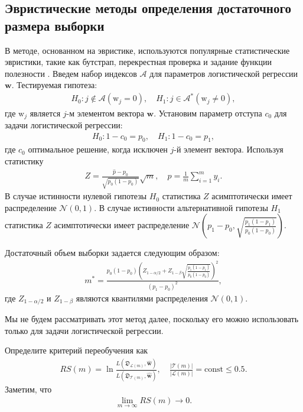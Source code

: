 \subsection{Эвристические методы определения достаточного размера выборки}
В методе, основанном на эвристике, используются популярные статистические эвристики, такие как бутстрап, перекрестная проверка и задание функции полезности .
Введем набор индексов $\mathcal {A} $ для параметров логистической регрессии $\textbf {w} $. Тестируемая гипотеза:
\[
\label{eq:hb:1}
\begin{aligned}
	H_0: j \not\in\mathcal{A} \left(\text{w}_{j} = 0\right), \quad H_1: j \in \mathcal{A}^* \left(\text{w}_{j} \not= 0\right),
\end{aligned}
\]
где $\text{w}_{j}$ является $j$-м элементом вектора $\textbf{w}$.
Установим параметр отступа $ c_0 $ для задачи логистической регрессии:
\[
\label{eq:hb:2}
\begin{aligned}
	H_0: 1-c_0 = p_0, \quad H_1: 1-c_0 = p_1,
\end{aligned}
\]
где $c_0$ оптимальное решение, когда исключен $j$-й элемент вектора.
Используя статистику
\[
\label{eq:hb:3}
\begin{aligned}
	Z = \frac{\hat{p}-p_0}{\sqrt{p_0(1-p_0)}}\sqrt{m}, \quad \hat{p} = \frac{1}{m}\sum_{i=1}^{m}y_i.
\end{aligned}
\]
В случае истинности нулевой гипотезы $H_0$ статистика $Z$ асимптотически имеет распределение $\mathcal{N}\left(0, 1\right)$. В случае истинности альтернативной гипотезы $H_1$ статистика $Z$  асимптотически имеет распределение $ \mathcal{N}\left(p_1-p_0, \sqrt{\frac{p_1(1-p_1)}{p_0(1-p_0)}}\right)$.
      
Достаточный объем выборки задается следующим образом:
\[
\label{eq:hb:4}
\begin{aligned}
	m^* = \frac{p_0(1-p_0)\left(Z_{1-\alpha/2} + Z_{1-\beta}\sqrt{\frac{p_1(1-p_1)}{p_0(1-p_0)}}\right)^2}{(p_1-p_0)^2},
\end{aligned}
\]
где $Z_{1-\alpha/2}$ и $Z_{1-\beta}$ являются квантилями распределения $\mathcal{N}\left(0, 1\right)$.
    
Мы не будем рассматривать этот метод далее, поскольку его можно использовать только для задачи логистической регрессии.
    
Определите критерий переобучения как
\[
\label{eq:hb:5}
\begin{aligned}
	RS(m) = \ln\frac{L(\mathfrak{D}_{\mathcal{L}(m)}, \hat{\textbf{w}})}{L(\mathfrak{D}_{\mathcal{T}(m)}, \hat{\textbf{w}})}, \quad \frac{|\mathcal{T}(m)|}{|\mathcal{L}(m)|} = \text{const} \leq 0.5.
\end{aligned}
\]
Заметим, что
\[
\label{eq:hb:6}
\begin{aligned}
	\lim_{m\to \infty}RS(m) \to 0.
\end{aligned}
\]

